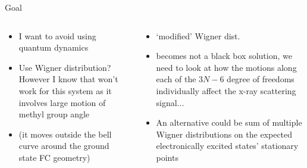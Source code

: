 \documentclass{beamer}
\begin{document}
\begin{frame}{Goal}
	\begin{columns} 
		\begin{column}{.5\textwidth}
			\begin{itemize}

				\item I want to avoid using quantum dynamics
				\item  Use Wigner distribution? However I know that won't work for this system as it involves large motion of methyl group angle
				\item (it moves outside the bell curve around the ground state FC geometry)
				
			\end{itemize}
		\end{column}
		\begin{column}{.5\textwidth}
			\begin{itemize}
				\item `modified' Wigner dist.
				\item becomes not a black box solution, we need to look at how the motions along each of the $3N-6$ degree of freedoms individually affect the x-ray scattering signal...
				\item An alternative could be sum of multiple Wigner distributions on the expected electronically excited states' stationary points
			\end{itemize}
		\end{column}%
		
	\end{columns}
\end{frame}
\end{document}
